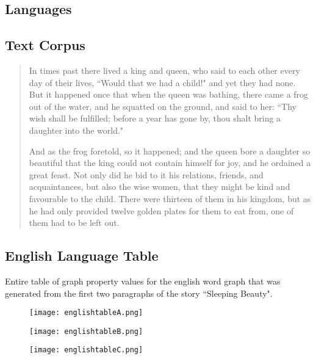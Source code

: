 \begin{appendices}
\chapter{Languages}
\section{Text Corpus}\label{textcorpus}
\begin{quote}
In times past there lived a king and queen, who said to each other every day of their lives, ``Would that we had a child!" and yet they had none. But it happened once that when the queen was bathing, there came a frog out of the water, and he squatted on the ground, and said to her: ``Thy wish shall be fulfilled; before a year has gone by, thou shalt bring a daughter into the world."

And as the frog foretold, so it happened; and the queen bore a daughter so beautiful that the king could not contain himself for joy, and he ordained a great feast. Not only did he bid to it his relations, friends, and acquaintances, but also the wise women, that they might be kind and favourable to the child. There were thirteen of them in his kingdom, but as he had only provided twelve golden plates for them to eat from, one of them had to be left out.
\end{quote}
\section{English Language Table}\label{app:engtable}
Entire table of graph property values for the english word graph that was generated from the first two paragraphs of the story ``Sleeping Beauty".
\begin{figure}[H]
	\centering
	\texttt{[image: englishtableA.png]}
\end{figure}
\begin{figure}[H]
	\centering
	\texttt{[image: englishtableB.png]}
\end{figure}
\begin{figure}[H]
	\centering
	\texttt{[image: englishtableC.png]}
\end{figure}

\end{appendices}